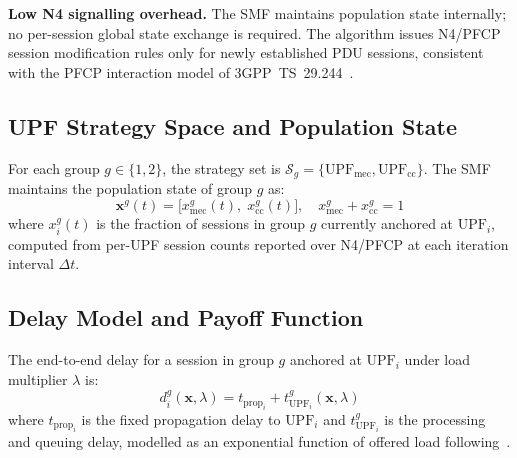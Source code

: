 \documentclass[conference]{IEEEtran}
\begin{document}
\textbf{Low N4 signalling overhead.} The SMF maintains
population state internally; no per-session global state
exchange is required. The algorithm issues N4/PFCP
session modification rules only for newly established
PDU sessions, consistent with
the PFCP interaction model of
3GPP~TS~29.244~\cite{3gpp_ts29244}.

\subsection{UPF Strategy Space and Population State}
\label{sec:strategy}

For each group $g \in \{1,2\}$, the strategy set is
$\mathcal{S}_g = \{\text{UPF}_\text{mec},
\text{UPF}_\text{cc}\}$.
The SMF maintains the population state of group $g$ as:
\begin{equation}
    \mathbf{x}^g(t) = \bigl[x_\text{mec}^g(t),\;
    x_\text{cc}^g(t)\bigr], \quad
    x_\text{mec}^g + x_\text{cc}^g = 1
    \label{eq:popstate}
\end{equation}
where $x_i^g(t)$ is the fraction of sessions in group
$g$ currently anchored at $\text{UPF}_i$, computed from
per-UPF session counts reported over N4/PFCP at each
iteration interval $\Delta t$.

\subsection{Delay Model and Payoff Function}
\label{sec:delay}

The end-to-end delay for a session in group $g$ anchored
at $\text{UPF}_i$ under load multiplier $\lambda$ is:
\begin{equation}
    d_i^g(\mathbf{x},\lambda) = t_{\text{prop}_i}
    + t_{\text{UPF}_i}^g(\mathbf{x},\lambda)
    \label{eq:delay}
\end{equation}
where $t_{\text{prop}_i}$ is the fixed propagation delay
to $\text{UPF}_i$ and $t_{\text{UPF}_i}^g$ is the
processing and queuing delay, modelled as an exponential
function of offered load following~\cite{Alevizaki2021upf}.
\end{document}
